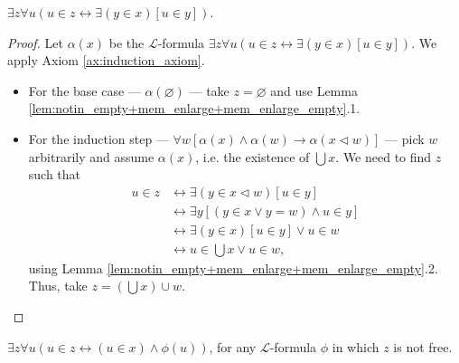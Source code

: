 \begin{theorem}
    \label{thm:exists_sUnion}
    \leanok
    $\exists z \forall u (u \in z \leftrightarrow \exists (y\in x)[u \in y])$.
\end{theorem}

\begin{proof}
    \leanok
    Let $\alpha (x)$ be the $\mathcal{L}$-formula 
    $\exists z \forall u (u \in z \leftrightarrow \exists (y\in x)[u \in y])$.
    We apply Axiom \ref{ax:induction_axiom}.
    \begin{itemize}
        \item For the base case — $\alpha (\varnothing)$ — take $z=\varnothing$ and use 
        Lemma \ref{lem:notin_empty+mem_enlarge+mem_enlarge_empty}.1.
        \item For the induction step 
        — $\forall w[\alpha(x) \land \alpha(w) \rightarrow \alpha(x \lhd w)]$ — 
        pick $w$ arbitrarily and assume $\alpha(x)$, i.e. the existence of $\bigcup x$.
        We need to find $z$ such that
        \begin{equation*}
        \begin{split}
            u \in z & \leftrightarrow \exists (y \in x \lhd w)[u \in y]\\
            & \leftrightarrow \exists y[(y \in x \lor y = w) \land u \in y]\\
            & \leftrightarrow \exists(y \in x)[u \in y] \lor u \in w\\
            & \leftrightarrow u \in \bigcup x \lor u \in w,
        \end{split}
        \end{equation*}
        using Lemma \ref{lem:notin_empty+mem_enlarge+mem_enlarge_empty}.2. 
        Thus, take $z = (\bigcup x) \cup w$.
    \end{itemize}
\end{proof}

\begin{theorem}
    \label{thm:comp_scheme}
    \leanok
    $\exists z \forall u (u\in z \leftrightarrow (u \in x) \land \phi (u))$, 
    for any $\mathcal{L}$-formula $\phi$ in which $z$ is not free.
\end{theorem}

